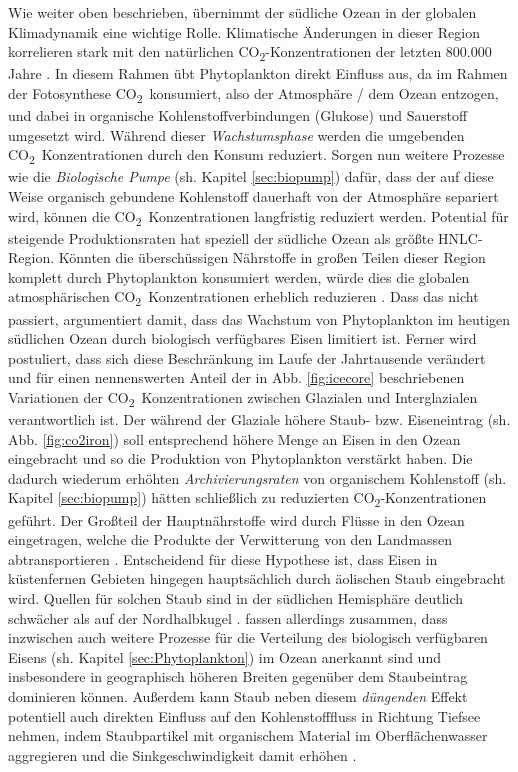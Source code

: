 \documentclass[12pt,a4paper,onecolumn]{scrartcl}
\newcommand{\cotwo}{CO\textsubscript{2}}
\begin{document}
Wie weiter oben beschrieben, übernimmt der südliche Ozean in der globalen Klimadynamik eine wichtige Rolle. Klimatische Änderungen in dieser Region korrelieren stark mit den natürlichen \cotwo -Konzentrationen der letzten 800.000 Jahre \citep{Fischer.2010}. In diesem Rahmen übt Phytoplankton direkt Einfluss aus, da im Rahmen der Fotosynthese \cotwo \ konsumiert, also der Atmosphäre / dem Ozean entzogen, und dabei in organische Kohlenstoffverbindungen (Glukose) und Sauerstoff umgesetzt wird. Während dieser \textit{Wachstumsphase} werden die umgebenden \cotwo \ Konzentrationen durch den Konsum reduziert. Sorgen nun weitere Prozesse wie die \textit{Biologische Pumpe} (sh. Kapitel \ref{sec:biopump}) dafür, dass der auf diese Weise organisch gebundene Kohlenstoff dauerhaft von der Atmosphäre separiert wird, können die \cotwo \ Konzentrationen langfristig reduziert werden. Potential für steigende Produktionsraten hat speziell der südliche Ozean als größte HNLC-Region. Könnten die überschüssigen Nährstoffe in großen Teilen dieser Region komplett durch Phytoplankton konsumiert werden, würde dies die globalen atmosphärischen \cotwo \ Konzentrationen erheblich reduzieren \citep{Martin.1990}. Dass das nicht passiert, argumentiert \citet{Martin.1990} damit, dass das Wachstum von Phytoplankton im heutigen südlichen Ozean durch biologisch verfügbares Eisen limitiert ist. Ferner wird postuliert, dass sich diese Beschränkung im Laufe der Jahrtausende verändert und für einen nennenswerten Anteil der in Abb. \ref{fig:icecore} beschriebenen Variationen der \cotwo \ Konzentrationen zwischen Glazialen und Interglazialen verantwortlich ist. Der während der Glaziale höhere Staub- bzw. Eiseneintrag (sh. Abb. \ref{fig:co2iron}) soll entsprechend höhere Menge an Eisen in den Ozean eingebracht und so die Produktion von Phytoplankton verstärkt haben. Die dadurch wiederum erhöhten \textit{Archivierungsraten} von organischem Kohlenstoff (sh. Kapitel \ref{sec:biopump}) hätten schließlich zu reduzierten \cotwo -Konzentrationen geführt. Der Großteil der Hauptnährstoffe wird durch Flüsse in den Ozean eingetragen, welche die Produkte der Verwitterung von den Landmassen abtransportieren \citep{Emerson.2009}.
Entscheidend für diese Hypothese ist, dass Eisen in küstenfernen Gebieten hingegen hauptsächlich durch äolischen Staub eingebracht wird. Quellen für solchen Staub sind in der südlichen Hemisphäre deutlich schwächer als auf der Nordhalbkugel \citep{Shao.2011}.  \citet{Tagliabue.2017} fassen allerdings zusammen, dass inzwischen auch weitere Prozesse für die Verteilung des biologisch verfügbaren Eisens (sh. Kapitel \ref{sec:Phytoplankton}) im Ozean anerkannt sind und insbesondere in geographisch höheren Breiten gegenüber dem Staubeintrag dominieren können. Außerdem kann Staub neben diesem  \textit{düngenden} Effekt potentiell auch direkten Einfluss auf den Kohlenstofffluss in Richtung Tiefsee nehmen, indem Staubpartikel mit organischem Material im Oberflächenwasser aggregieren und die Sinkgeschwindigkeit damit  erhöhen \citep{vanderJagt.2018} . \\
\end{document}
